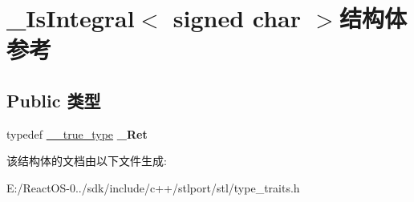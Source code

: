 \hypertarget{struct___is_integral_3_01signed_01char_01_4}{}\section{\+\_\+\+Is\+Integral$<$ signed char $>$结构体 参考}
\label{struct___is_integral_3_01signed_01char_01_4}
\subsection*{Public 类型}
\begin{DoxyCompactItemize}
\item 
\mbox{\label{struct___is_integral_3_01signed_01char_01_4_a6dfb5441513cb75df419e4acb21eee76}} 
typedef \hyperlink{struct____true__type}{\+\_\+\+\_\+true\+\_\+type} {\bfseries \+\_\+\+Ret}
\end{DoxyCompactItemize}


该结构体的文档由以下文件生成\+:\begin{DoxyCompactItemize}
\item 
E\+:/\+React\+O\+S-\/0../sdk/include/c++/stlport/stl/type\+\_\+traits.\+h\end{DoxyCompactItemize}
